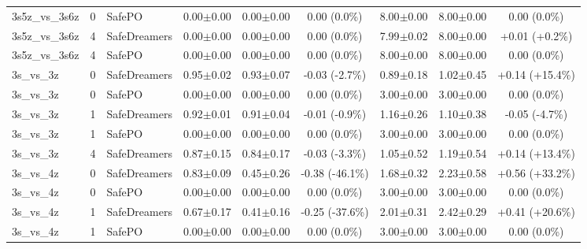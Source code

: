 \documentclass{article}
\begin{document}
\begin{longtable}{lclcccccc}
3s5z\_vs\_3s6z & 0 & SafePO & 0.00$\pm$0.00 & 0.00$\pm$0.00 & \textcolor{red!40!black}{0.00 (0.0\%)} & 8.00$\pm$0.00 & 8.00$\pm$0.00 & \textcolor{green!40!black}{0.00 (0.0\%)} \\
3s5z\_vs\_3s6z & 4 & SafeDreamers & 0.00$\pm$0.00 & 0.00$\pm$0.00 & \textcolor{red!40!black}{0.00 (0.0\%)} & 7.99$\pm$0.02 & 8.00$\pm$0.00 & \textcolor{red!40!black}{+0.01 (+0.2\%)} \\
3s5z\_vs\_3s6z & 4 & SafePO & 0.00$\pm$0.00 & 0.00$\pm$0.00 & \textcolor{red!40!black}{0.00 (0.0\%)} & 8.00$\pm$0.00 & 8.00$\pm$0.00 & \textcolor{green!40!black}{0.00 (0.0\%)} \\
\midrule
3s\_vs\_3z & 0 & SafeDreamers & 0.95$\pm$0.02 & 0.93$\pm$0.07 & \textcolor{red!40!black}{-0.03 (-2.7\%)} & 0.89$\pm$0.18 & 1.02$\pm$0.45 & \textcolor{red!70!black}{+0.14 (+15.4\%)} \\
3s\_vs\_3z & 0 & SafePO & 0.00$\pm$0.00 & 0.00$\pm$0.00 & \textcolor{red!40!black}{0.00 (0.0\%)} & 3.00$\pm$0.00 & 3.00$\pm$0.00 & \textcolor{green!40!black}{0.00 (0.0\%)} \\
3s\_vs\_3z & 1 & SafeDreamers & 0.92$\pm$0.01 & 0.91$\pm$0.04 & \textcolor{red!40!black}{-0.01 (-0.9\%)} & 1.16$\pm$0.26 & 1.10$\pm$0.38 & \textcolor{green!40!black}{-0.05 (-4.7\%)} \\
3s\_vs\_3z & 1 & SafePO & 0.00$\pm$0.00 & 0.00$\pm$0.00 & \textcolor{red!40!black}{0.00 (0.0\%)} & 3.00$\pm$0.00 & 3.00$\pm$0.00 & \textcolor{green!40!black}{0.00 (0.0\%)} \\
3s\_vs\_3z & 4 & SafeDreamers & 0.87$\pm$0.15 & 0.84$\pm$0.17 & \textcolor{red!40!black}{-0.03 (-3.3\%)} & 1.05$\pm$0.52 & 1.19$\pm$0.54 & \textcolor{red!55!black}{+0.14 (+13.4\%)} \\
\midrule
3s\_vs\_4z & 0 & SafeDreamers & 0.83$\pm$0.09 & 0.45$\pm$0.26 & \textcolor{red!85!black}{-0.38 (-46.1\%)} & 1.68$\pm$0.32 & 2.23$\pm$0.58 & \textcolor{red!85!black}{+0.56 (+33.2\%)} \\
3s\_vs\_4z & 0 & SafePO & 0.00$\pm$0.00 & 0.00$\pm$0.00 & \textcolor{red!40!black}{0.00 (0.0\%)} & 3.00$\pm$0.00 & 3.00$\pm$0.00 & \textcolor{green!40!black}{0.00 (0.0\%)} \\
3s\_vs\_4z & 1 & SafeDreamers & 0.67$\pm$0.17 & 0.41$\pm$0.16 & \textcolor{red!85!black}{-0.25 (-37.6\%)} & 2.01$\pm$0.31 & 2.42$\pm$0.29 & \textcolor{red!70!black}{+0.41 (+20.6\%)} \\
3s\_vs\_4z & 1 & SafePO & 0.00$\pm$0.00 & 0.00$\pm$0.00 & \textcolor{red!40!black}{0.00 (0.0\%)} & 3.00$\pm$0.00 & 3.00$\pm$0.00 & \textcolor{green!40!black}{0.00 (0.0\%)} \\

\end{longtable}
\end{document}
